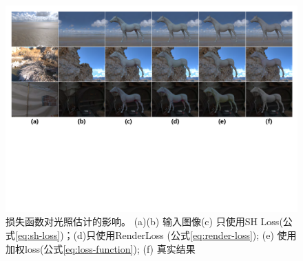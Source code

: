 \begin{figure}
  \includegraphics[width=1.0\textwidth]{Img/fig-test-weight.pdf}
  \caption[损失函数对光照估计的影响]{
    \label{fig:test-weight}
    损失函数对光照估计的影响。 (a)(b) 输入图像(c) 只使用SH Loss(公式\ref{eq:sh-loss})；(d)只使用RenderLoss (公式\ref{eq:render-loss}); (e) 使用加权loss(公式\ref{eq:loss-function}); (f) 真实结果}
\end{figure}